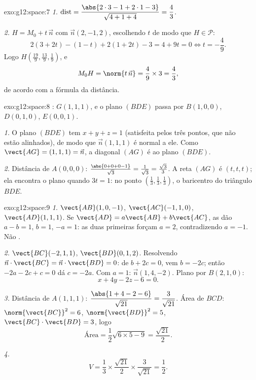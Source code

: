 \begin{solution}{exo:g12:space:7}
\emph{1.} $\operatorname{dist} = \dfrac{\abs{2\cdot3 - 1 + 2\cdot1 - 3}}
{\sqrt{4 + 1 + 4}} = \dfrac{4}{3}$.

\emph{2.} $H = M_0 + t\,\vec n$ com $\vec n(2, -1, 2)$, escolhendo $t$ de
modo que $H \in \mathcal P$:
\[
2(3 + 2t) - (1 - t) + 2(1 + 2t) - 3 = 4 + 9t = 0 \iff t = -\frac49 .
\]
Logo $H\left(\frac{19}{9}, \frac{13}{9}, \frac19\right)$, e
\[
M_0H = \norm{t\,\vec n} = \frac49 \times 3 = \frac43,
\]
de acordo com a fórmula da distância.
\end{solution}

\begin{solution}{exo:g12:space:8}
: $G(1,1,1)$, e o plano $(BDE)$ passa por $B(1,0,0)$,
$D(0,1,0)$, $E(0,0,1)$.

\emph{1.} O plano $(BDE)$ tem  $x + y + z = 1$ (satisfeita pelos
três pontos, que não estão alinhados), de modo que $\vec n(1,1,1)$ é
normal a ele. Como $\vect{AG} = (1,1,1) = \vec n$, a diagonal $(AG)$ é
 ao plano $(BDE)$.

\emph{2.} Distância de $A(0,0,0)$:
$\frac{\abs{0 + 0 + 0 - 1}}{\sqrt3} = \frac{1}{\sqrt3} = \frac{\sqrt3}{3}$.
A reta $(AG)$ é $(t, t, t)$; ela encontra o plano quando $3t = 1$: no
ponto $\left(\frac13, \frac13, \frac13\right)$, o baricentro do triângulo
$BDE$.
\end{solution}

\begin{solution}{exo:g12:space:9}
\emph{1.} $\vect{AB}(1, 0, -1)$, $\vect{AC}(-1, 1, 0)$,
$\vect{AD}(1, 1, 1)$. Se $\vect{AD} = a\vect{AB} + b\vect{AC}$, as
 dão $a - b = 1$, $b = 1$, $-a = 1$: as duas primeiras forçam
$a = 2$, contradizendo $a = -1$. Não .

\emph{2.} $\vect{BC}(-2, 1, 1)$, $\vect{BD}(0, 1, 2)$. Resolvendo
$\vec n \cdot \vect{BC} = \vec n \cdot \vect{BD} = 0$: de
$b + 2c = 0$, vem $b = -2c$; então $-2a - 2c + c = 0$ dá $c = -2a$. Com
$a = 1$: $\vec n(1, 4, -2)$. Plano por $B(2,1,0)$:
\[
x + 4y - 2z - 6 = 0 .
\]

\emph{3.} Distância de $A(1,1,1)$:
$\dfrac{\abs{1 + 4 - 2 - 6}}{\sqrt{21}} = \dfrac{3}{\sqrt{21}}$.
Área de $BCD$: $\norm{\vect{BC}}^2 = 6$, $\norm{\vect{BD}}^2 = 5$,
$\vect{BC}\cdot\vect{BD} = 3$, logo
\[
\text{Área} = \frac12\sqrt{6 \times 5 - 9} = \frac{\sqrt{21}}{2}.
\]

\emph{4.}
\[
V = \frac13 \times \frac{\sqrt{21}}{2} \times \frac{3}{\sqrt{21}}
= \frac12 .
\]
\end{solution}

